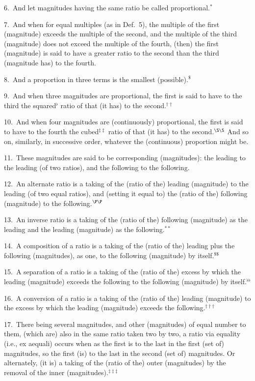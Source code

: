 \begin{Parallel}{}{}
{6.~And let magnitudes having the same ratio be called proportional.$^\ast$

7.~And when for equal multiples (as in Def.~5), the multiple of the first (magnitude) exceeds 
the multiple of the second, and the multiple of the third (magnitude) does not
exceed the multiple of the fourth, (then) the first (magnitude) is said to have a greater ratio
to the second than the third (magnitude has) to the fourth.

8.~And a  proportion in three terms is the smallest (possible).$^\$$

9.~And when three magnitudes are proportional, the first is said to
have to the third the squared$^\flat$ ratio  of that (it has) to the second.$^{\dag\dag}$

10.~And when four magnitudes are (continuously) proportional, the first is said to have to the fourth the cubed$^{\ddag\ddag}$ ratio  of that (it has) to the second.$^{\S\S}$ And  so on,   similarly, in successive order, whatever the (continuous) proportion
might be.

11.~These magnitudes are said to be corresponding (magnitudes):
the leading to the leading (of two ratios), and
the following to the following.

12.~An alternate ratio is a taking of the (ratio of the) leading  (magnitude) to the leading (of two equal ratios), and (setting it equal to) the (ratio of the)
following   (magnitude) to the following.$^{\P\P}$

13.~An inverse  ratio is a taking of the (ratio of the) following (magnitude) as the leading and the leading (magnitude) as the
following.$^{\ast\ast}$

14.~A composition of a  ratio is a taking of the (ratio of the) leading plus the following (magnitudes),
as one, to the  following (magnitude) by itself.$^{\$\$}$

 15.~A separation of a  ratio is a taking of the (ratio of the) excess by which the
 leading (magnitude) exceeds the following to the following (magnitude)
 by itself.$^{\flat\flat}$
 
16.~A conversion  of a ratio is a taking of the (ratio of the) leading (magnitude) 
 to the excess by which the leading (magnitude) exceeds the following.$^{\dag\dag\dag}$
 
17.~There being several magnitudes,
   and  other (magnitudes)
 of equal  number to them, (which are)  also in
 the same ratio taken two by two,
  a  ratio via equality (i.e.,  ex aequali) occurs when  as the first is to the last  in the first (set of) magnitudes, so  the first (is) to the last   in the second (set of) magnitudes. Or alternately, (it is) a taking of the (ratio of the) outer (magnitudes) by the removal of the 
 inner (magnitudes).$^{\ddag\ddag\ddag}$
 
}
\end{Parallel}
